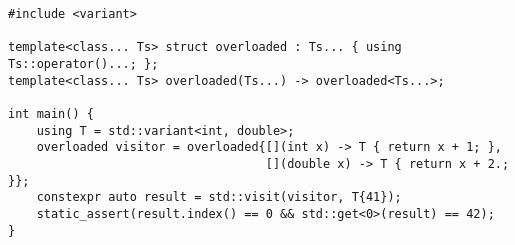 \begin{lstlisting}[title=\href{https://godbolt.org/z/yD7yf5}{\texttt{godbolt.org/z/yD7yf5}}]
#include <variant>

template<class... Ts> struct overloaded : Ts... { using Ts::operator()...; };
template<class... Ts> overloaded(Ts...) -> overloaded<Ts...>;

int main() {
    using T = std::variant<int, double>;
    overloaded visitor = overloaded{[](int x) -> T { return x + 1; },
                                    [](double x) -> T { return x + 2.; }};
    constexpr auto result = std::visit(visitor, T{41});
    static_assert(result.index() == 0 && std::get<0>(result) == 42);
}
\end{lstlisting}
